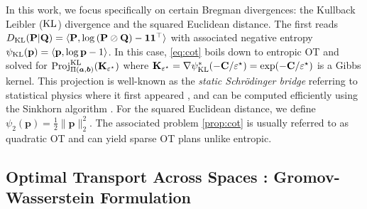In this work, we focus specifically on 
certain Bregman divergences: the Kullback Leibler ($\operatorname{KL}$) divergence and the squared Euclidean distance.
The first reads $D_{\operatorname{KL}}({\mathbf{P}} | {\mathbf{Q}}) = \langle {\mathbf{P}}, \log \left({\mathbf{P}} \oslash {\mathbf{Q}} \right) - \bm{1} \bm{1}^\top \rangle$ with associated negative entropy $\psi_{\operatorname{KL}}(\mathbf{p}) = \langle \mathbf{p}, \log \mathbf{p} - 1 \rangle$. In this case, \eqref{eq:cot} boils down to entropic OT and solved for $\operatorname{Proj}^{\operatorname{KL}}_{\Pi(\bm{a}, \bm{b})}({\mathbf{K}}_{\varepsilon^\star})$ where ${\mathbf{K}}_{\varepsilon^\star} = \nabla \psi_{\operatorname{KL}}^{*}(-{\mathbf{C}} / \varepsilon^\star) = \exp(-{\mathbf{C}} / \varepsilon^\star)$ is a Gibbs kernel. This projection is well-known as the \emph{static Schrödinger bridge} \cite{leonard2013survey} referring to statistical physics where it first appeared \cite{schrodinger1931umkehrung}, and can be computed efficiently using the Sinkhorn algorithm \cite{cuturi2013sinkhorn}. For the squared Euclidean distance, we define $\psi_{2}(\mathbf{p}) = \frac{1}{2} \| \mathbf{p} \|^2_2$. The associated problem \eqref{prop:cot} is usually referred to as quadratic OT \cite{lorenz2021quadratically} and can yield sparse OT plans unlike entropic.


\subsection{Optimal Transport Across Spaces : Gromov-Wasserstein Formulation}

